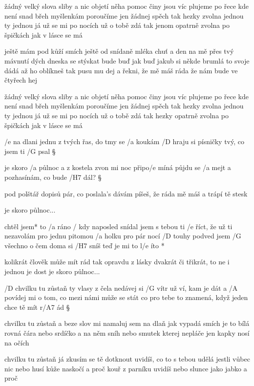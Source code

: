 žádný velký slova sliby a nic
objetí něha pomoc činy jsou víc
plujeme po řece kde není snad břeh
myšlenkám poroučíme jen žádnej spěch
tak hezky zvolna jednou ty jednou já
už se mi po nocích už o tobě zdá
tak jenom opatrně zvolna
po špičkách jak v lásce se má \s

ještě mám pod kůží smích
ještě od snídaně mléka chuť
a den na mě přes tvý mávnutí dých
dneska se stýskat bude buď jak buď
jakub si někde brumlá to svoje dádá
až ho oblíkneš tak pusu mu dej
a řekni, že mě máš ráda
že nám bude ve čtyřech hej \s

žádný velký slova sliby a nic
objetí něha pomoc činy jsou víc
plujeme po řece kde není snad břeh
myšlenkám poroučíme jen žádnej spěch
tak hezky zvolna jednou ty jednou já
už se mi po nocích už o tobě zdá
tak hezky opatrně zvolna
po špičkách jak v lásce se má 




/e na dlani jednu z tvých řas, do tmy se /a koukám
/D hraju si písničky tvý, co jsem ti /G psal \S

je skoro /a půlnoc a z kostela zvon mi noc připo/e míná
půjdu se /a mejt a pozhasínám, co bude /H7 dál? \S

pod polštář dopisů pár, co poslala's dávám
píšeš, že ráda mě máš a trápí tě stesk \s

je skoro půlnoc...

\R chtěl jsem* to /a ráno
   / kdy naposled snídal jsem s tebou
   ti /e říct, že už ti nezavolám
   pro jednu pitomou /a holku
   pro pár nocí /D touhy
   podved jsem /G všechno o čem doma si /H7 sníš
   teď je mi to l/e íto *

kolikrát člověk může mít rád tak opravdu z lásky
dvakrát či třikrát, to ne i jednou je dost
je skoro půlnoc...

\rr




/D chvilku tu zůstaň ty vlasy z čela nedávej si
/G vítr už ví, kam je dát
a /A povídej mi o tom, co mezi námi může se stát
co pro tebe to znamená, když jeden chce tě mít r/A7 ád \S

chvilku tu zůstaň a beze slov mi namaluj
sem na dlaň jak vypadá smích
je to bílá rovná čára nebo srdíčko a na něm sníh
nebo smutek kterej nepláče jen kapky nosí na očích \s

chvilku tu zůstaň já zkusím se tě dotknout
uvidíš, co to s tebou udělá
jestli vůbec nic nebo husí kůže naskočí a proč
kouř z parníku uvidíš nebo slunce jako jabko a proč \s

